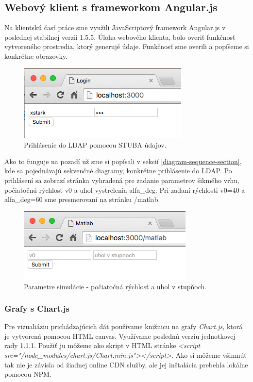 \subsection{Webový klient s frameworkom Angular.js}\label{section-angular-web}
Na klientskú časť práce sme využili JavaScriptový framework Angular.js v poslednej stabilnej verzii 1.5.5. Úloha webového klienta, bolo overiť funkčnosť vytvoreného prostredia, ktorý generujé údaje. Funkčnosť sme overili a popíšeme si konkrétne obrazovky.

\begin{figure}[H]
  \centering
  \includegraphics[scale=0.7]{img/code/angular-login.png}
  \caption{Prihlásenie do LDAP pomocou STUBA údajov.}
  \label{img-angular-login}
\end{figure}

Ako to funguje na pozadí už sme si popísali v sekcií \ref{diagram-sequence-section}, kde sa pojednávajú sekvenčné diagramy, konkrétne prihlásenie do LDAP.
Po prihlásení sa zobrazí stránka vyhradená pre zadanie parametrov šikmého vrhu, počiatočnú rýchlosť v0 a uhol vystrelenia alfa\_deg. Pri zadaní rýchlosti v0=40 a alfa\_deg=60 sme presmerovaní na stránku /matlab.

\begin{figure}[H]
  \centering
  \includegraphics[scale=0.7]{img/code/angular-simulation-param.png}
  \caption{Parametre simulácie - počiatočná rýchlosť a uhol v stupňoch.}
  \label{img-angular-params}
\end{figure}


\subsubsection{Grafy s Chart.js}
Pre vizualiáziu prichádzajúcich dát používame knižnicu na grafy \textit{Chart.js}, ktorá je vytvorená pomocou HTML canvas. Využívame poslednú verziu jednotkovej rady 1.1.1. Použiť ju môžeme ako skript v HTML stránke \textit{<script src="/node\_modules/chart.js/Chart.min.js"></script>}. Ako si môžeme všimnúť tak nie je závisla od žiadnej online CDN služby, ale jej inštalácia prebehla lokálne pomocou NPM.

